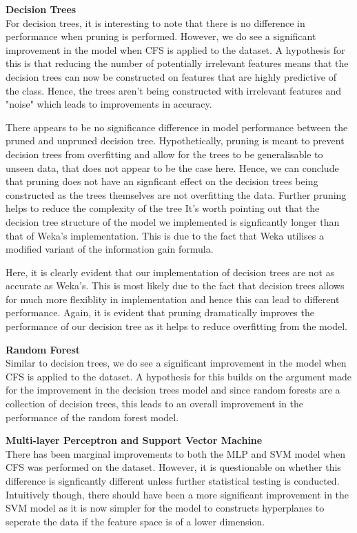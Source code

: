 \documentclass[12pt]{article}
\begin{document}
\textbf{Decision Trees}\\
For decision trees, it is interesting to note that there is no difference in performance when pruning is performed. However, we do see a significant improvement in the model when CFS is applied to the dataset. A hypothesis for this is that reducing the number of potentially irrelevant features means that the decision trees can now be constructed on features that are highly predictive of the class. Hence, the trees aren't being constructed with irrelevant features and "noise" which leads to improvements in accuracy.

There appears to be no significance difference in model performance between the pruned and unpruned decision tree. Hypothetically, pruning is meant to prevent decision trees from overfitting and allow for the trees to be generalisable to unseen data, that does not appear to be the case here. Hence, we can conclude that pruning does not have an signficant effect on the decision trees being constructed as the trees themselves are not overfitting the data. Further pruning helps to reduce the complexity of the tree It's worth pointing out that the decision tree structure of the model we implemented is signficantly longer than that of Weka's implementation. This is due to the fact that Weka utilises a modified variant of the information gain formula.

Here, it is clearly evident that our implementation of decision trees are not as accurate as Weka's. This is most likely due to the fact that decision trees allows for much more flexiblity in implementation and hence this can lead to different performance. Again, it is evident that pruning dramatically improves the performance of our decision tree as it helps to reduce overfitting from the model.

\textbf{Random Forest}\\
Similar to decision trees, we do see a significant improvement in the model when CFS is applied to the dataset. A hypothesis for this builds on the argument made for the improvement in the decision trees model and since random forests are a collection of decision trees, this leads to an overall improvement in the performance of the random forest model.

\textbf{Multi-layer Perceptron and Support Vector Machine}\\
There has been marginal improvements to both the MLP and SVM model when CFS was performed on the dataset. However, it is questionable on whether this difference is signficantly different unless further statistical testing is conducted. Intuitively though, there should have been a more significant improvement in the SVM model as it is now simpler for the model to constructs hyperplanes to seperate the data if the feature space is of a lower dimension. 
\end{document}
